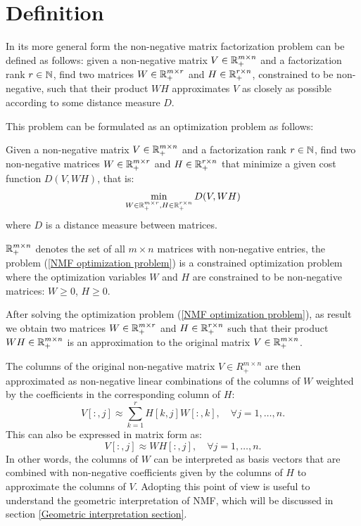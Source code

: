\section{Definition}
In its more general form the non-negative matrix factorization problem can be defined as follows: given a non-negative matrix $V \in \mathbb{R}_+^{m \times n}$ and a factorization rank $r \in \mathbb{N}$, find two matrices
$W \in \mathbb{R}_+^{m \times r}$ and $H \in \mathbb{R}_+^{r \times n}$, constrained to be non-negative, such that their product $WH$ approximates $V$ as closely as possible according to some distance measure $D$.
\par
This problem can be formulated as an optimization problem as follows:
\begin{definition}\label{NMF optimization problem}
Given a non-negative matrix $V \in \mathbb{R}_+^{m \times n}$ and a factorization rank $r \in \mathbb{N}$, find two non-negative matrices $W \in \mathbb{R}_+^{m \times r}$ and $H \in \mathbb{R}_+^{r \times n}$ that minimize 
a given cost function $D(V, WH)$, that is:
\begin{equation}
\min_{W \in \mathbb{R}_+^{m \times r}, H \in \mathbb{R}_+^{r \times n}} D(V, WH)
\end{equation}
where $D$ is a distance measure between matrices.
\end{definition}
\begin{remark}
    $\mathbb{R}_+^{m \times n}$ denotes the set of all $m \times n$ matrices with non-negative entries, the problem (\ref{NMF optimization problem}) is a constrained optimization problem where the optimization variables $W$ and $H$ are constrained to be non-negative matrices: $W \geq 0$, $H \geq 0$.
\end{remark}
After solving the optimization problem (\ref{NMF optimization problem}), as result we obtain two matrices $W \in \mathbb{R}_+^{m \times r}$ and $H \in \mathbb{R}_+^{r \times n}$ such that their product $WH \in \mathbb{R}_+^{m \times n}$ is an approximation to the original matrix $V \in \mathbb{R}_+^{m \times n}$.
\par
The columns of the original non-negative matrix $V \in R^{m \times n}_+$ are then approximated as non-negative linear combinations of the columns of $W$ weighted by the coefficients in the corresponding column of $H$:
\begin{equation}\label{formula for j-th column of V}
    V[:,j] \approx \sum_{k=1}^{r} H[k,j] W[:, k], \quad \forall j = 1, \ldots, n.
\end{equation}
This can also be expressed in matrix form as:
\begin{equation}
    V[:,j] \approx WH[:,j], \quad \forall j = 1, \ldots, n.
\end{equation}
In other words, the columns of $W$ can be interpreted as basis vectors that are combined with non-negative coefficients given by the columns of $H$ to approximate the columns of $V$.
Adopting this point of view is useful to understand the geometric interpretation of NMF, which will be discussed in section \ref{Geometric interpretation section}.

